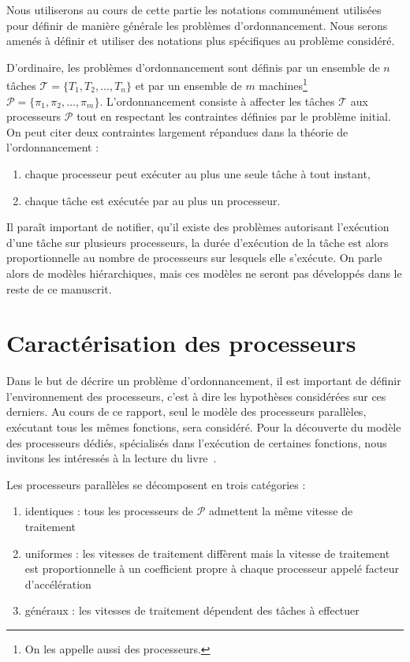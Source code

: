 \documentclass[a4paper,11pt]{report}
\begin{document}
Nous utiliserons au cours de cette partie les notations communément utilisées pour définir de
manière générale les problèmes d'ordonnancement. Nous serons amenés à définir et utiliser des
notations plus spécifiques au problème considéré.

D'ordinaire, les problèmes d'ordonnancement sont définis par un ensemble de $n$ tâches $\mathcal{T} =
\{T_1, T_2, \dots, T_n\}$ et par un ensemble de $m$ machines\footnote{On les appelle aussi des
processeurs.} $\mathcal{P} = \{\pi_1, \pi_2, \dots, \pi_m\}$. L'ordonnancement consiste à affecter les
tâches $\mathcal{T}$ aux processeurs $\mathcal{P}$ tout en respectant les contraintes définies par
le problème initial. On peut citer deux contraintes largement répandues dans la théorie de
l'ordonnancement :
\begin{enumerate}
    \item chaque processeur peut exécuter au plus une seule tâche à tout instant,
    \item chaque tâche est exécutée par au plus un processeur.
\end{enumerate}

Il paraît important de notifier, qu'il existe des problèmes autorisant l'exécution d'une tâche sur
plusieurs processeurs, la durée d'exécution de la tâche est alors proportionnelle au nombre de
processeurs sur lesquels elle s'exécute. On parle alors de modèles hiérarchiques, mais ces modèles
ne seront pas développés dans le reste de ce manuscrit.

\section{Caractérisation des processeurs}

Dans le but de décrire un problème d'ordonnancement, il est important de définir l'environnement des
processeurs, c'est à dire les hypothèses considérées sur ces derniers. Au cours de ce rapport, seul
le modèle des processeurs parallèles, exécutant tous les mêmes fonctions, sera considéré. Pour la
découverte du modèle des processeurs dédiés, spécialisés dans l'exécution de certaines fonctions,
nous invitons les intéressés à la lecture du livre~\cite{blazewicz_handbook_2007}.

Les processeurs parallèles se décomposent en trois catégories :
\begin{enumerate}
    \item identiques : tous les processeurs de $\mathcal{P}$ admettent la même vitesse de traitement
    \item uniformes : les vitesses de traitement diffèrent mais la vitesse de traitement est
        proportionnelle à un coefficient propre à chaque processeur appelé facteur d'accélération
    \item généraux : les vitesses de traitement dépendent des tâches à effectuer
\end{enumerate}
\end{document}

